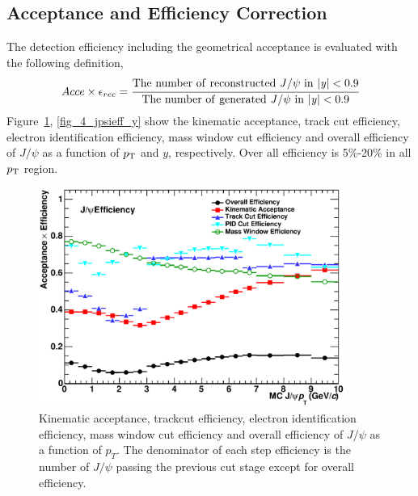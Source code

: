 \subsection{Acceptance and Efficiency Correction}
\label{sec_4_correction}
The detection efficiency including the geometrical acceptance is evaluated with the following definition, 
\begin{equation}
  Acce\times \epsilon_{rec} = \cfrac{\rm{The~ number~ of~ reconstructed}~ \it{J/\psi} ~\rm{in}~ |\it{y}| < \rm{0.9}}{\rm{The~number~of~generated}~\it{J/\psi} ~\rm{in}~ |\it{y}| < \rm{0.9}}
\end{equation}
Figure~\ref{fig_4_jpsieff_pt}, \ref{fig_4_jpsieff_y} show the kinematic acceptance, track cut efficiency, electron identification efficiency, mass window cut efficiency and overall efficiency of $J/\psi$ as a function of $p_{\rm{T}}$ and $y$, respectively.
Over all efficiency is 5\%-20\% in all $p_{\rm{T}}$ region. 
\begin{figure}[!h]
  \centering
  \includegraphics[width=10cm]{chap4/figure/Correction/JpsiEff_pt_stepbystep_bin2.eps}	
  \caption{Kinematic acceptance, trackcut efficiency, electron identification efficiency, mass window cut efficiency and overall efficiency of $J/\psi$ as a function of $p_{T}$. The denominator of each step efficiency is the number of $J/\psi$ passing the previous cut stage except for overall efficiency. }
  \label{fig_4_jpsieff_pt}
\end{figure}
